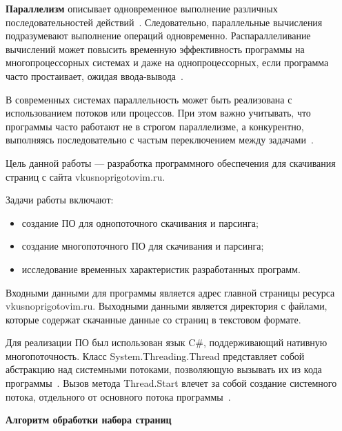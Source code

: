 

\textbf{Параллелизм} описывает одновременное выполнение различных последовательностей действий~\cite{posix-threads}. Следовательно, параллельные вычисления подразумевают выполнение операций одновременно. Распараллеливание вычислений может повысить временную эффективность программы на многопроцессорных системах и даже на однопроцессорных, если программа часто простаивает, ожидая ввода-вывода~\cite{tanenbaum}.

В современных системах параллельность может быть реализована с использованием потоков или процессов. При этом важно учитывать, что программы часто работают не в строгом параллелизме, а конкурентно, выполняясь последовательно с частым переключением между задачами~\cite{tanenbaum}.

Цель данной работы — разработка программного обеспечения для скачивания страниц с сайта vkusnoprigotovim.ru.

Задачи работы включают:

\begin{itemize}
	\item создание ПО для однопоточного скачивания и парсинга;
	\item создание многопоточного ПО для скачивания и парсинга;
	\item исследование временных характеристик разработанных программ.
\end{itemize}


Входными данными для программы является адрес главной страницы ресурса vkusnoprigotovim.ru.
Выходными данными является директория с файлами, которые содержат скачанные данные со страниц в текстовом формате.


Для реализации ПО был использован язык C\#, поддерживающий нативную многопоточность. Класс System.Threading.Thread представляет собой абстракцию над системными потоками, позволяющую вызывать их из кода программы~\cite{nutshell}. Вызов метода Thread.Start влечет за собой создание системного потока, отдельного от основного потока программы~\cite{Thread.Start}.
 
\textbf{Алгоритм обработки набора страниц}

